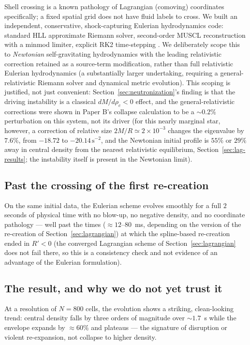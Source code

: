 \documentclass[11pt]{article}
\begin{document}
Shell crossing is a known pathology of Lagrangian (comoving) coordinates specifically; a fixed spatial grid does not have fluid labels to cross. We built an independent, conservative, shock-capturing Eulerian hydrodynamics code: standard HLL approximate Riemann solver, second-order MUSCL reconstruction with a minmod limiter, explicit RK2 time-stepping \citep{Toro2009}. We deliberately scope this to \emph{Newtonian} self-gravitating hydrodynamics with the leading relativistic correction retained as a source-term modification, rather than full relativistic Eulerian hydrodynamics (a substantially larger undertaking, requiring a general-relativistic Riemann solver and dynamical metric evolution). This scoping is justified, not just convenient: Section~\ref{sec:neutronization}'s finding is that the driving instability is a classical $dM/d\rho_c<0$ effect, and the general-relativistic corrections were shown in Paper B's collapse calculation to be a $\sim0.2\%$ perturbation on this system, not its driver (for this nearly marginal star, however, a correction of relative size $2M/R\simeq2\times10^{-3}$ changes the eigenvalue by $7.6\%$, from $-18.72$ to $-20.14\,\mathrm{s^{-2}}$, and the Newtonian initial profile is $55\%$ or $29\%$ away in central density from the nearest relativistic equilibrium, Section~\ref{sec:lag-results}; the instability itself is present in the Newtonian limit).

\subsection{Past the crossing of the first re-creation}

On the same initial data, the Eulerian scheme evolves smoothly for a full $2$ seconds of physical time with no blow-up, no negative density, and no coordinate pathology --- well past the times ($\approx12$--$80$~ms, depending on the version of the re-creation of Section~\ref{sec:lagrangian}) at which the spline-based re-creation ended in $R'<0$ (the converged Lagrangian scheme of Section~\ref{sec:lagrangian} does not fail there, so this is a consistency check and not evidence of an advantage of the Eulerian formulation).

\subsection{The result, and why we do not yet trust it}
\label{sec:convergence}

At a resolution of $N=800$ cells, the evolution shows a striking, clean-looking trend: central density falls by three orders of magnitude over $\sim1.7$~s while the envelope expands by $\approx60\%$ and plateaus --- the signature of disruption or violent re-expansion, not collapse to higher density.
\end{document}

